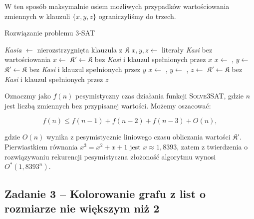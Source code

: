 W ten sposób maksymalnie osiem możliwych przypadków wartościowania zmiennych w klauzuli $\{x, y, z\}$ ograniczyliśmy do trzech. 

\begin{algorithm}[H]
	\caption{Rozwiązanie problemu 3-SAT}
	\begin{algorithmic}[1]
		\State \Return \true
		\EndIf
		
		\State 
		\State \textit{Kasia} $\gets$ nierozstrzygnięta klauzula z $\mathfrak{K}$ 
		\State \Return \false
		\EndIf
		\State $x, y, z \gets $ literały \textit{Kasi} bez wartościowania
		\State
		\State $x \gets $ \true
		\State $\mathfrak{K}' \gets \mathfrak{K}$ bez \textit{Kasi} i klauzul spełnionych przez $x$
		\State \Return \true
		\EndIf
		\State
		\State $x \gets $ \false, $y \gets $ \true {}
		\State $\mathfrak{K}' \gets \mathfrak{K}$ bez \textit{Kasi} i klauzul spełnionych przez $y$
		\State \Return \true
		\EndIf
		\State
		\State $x \gets $ \false, $y \gets $ \false, $z \gets $ \true {}
		\State $\mathfrak{K}' \gets \mathfrak{K}$ bez \textit{Kasi} i klauzul spełnionych przez $z$
		\State \Return \true
		\EndIf
		\EndProcedure
	\end{algorithmic}
\end{algorithm}

Oznaczmy jako $f(n)$ pesymistyczny czas działania funkcji \textsc{Solve3SAT}, gdzie $n$ jest liczbą zmiennych bez przypisanej wartości. Możemy oszacować:

\[
f(n) \leq f(n-1) + f(n-2) + f(n-3) + O(n),
\]

gdzie $O(n)$ wynika z pesymistycznie liniowego czasu obliczania wartości $\mathfrak{K}'$. Pierwiastkiem równania
$x^3 = x^2 + x + 1$
jest $x \approx 1{,}8393$, zatem z twierdzenia o rozwiązywaniu rekurencji pesymistyczna złożoność algorytmu wynosi $O^*(1{,}8393^n)$.

\subsection{Zadanie 3 -- Kolorowanie grafu z list o rozmiarze nie większym niż 2}
